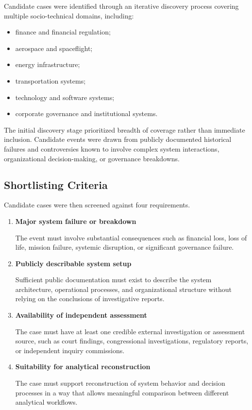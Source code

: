 Candidate cases were identified through an iterative discovery process
covering multiple socio-technical domains, including:

\begin{itemize}

\item finance and financial regulation;

\item aerospace and spaceflight;

\item energy infrastructure;

\item transportation systems;

\item technology and software systems;

\item corporate governance and institutional systems.

\end{itemize}

The initial discovery stage prioritized breadth of coverage rather than
immediate inclusion. Candidate events were drawn from publicly documented
historical failures and controversies known to involve complex system
interactions, organizational decision-making, or governance breakdowns.

\subsection{Shortlisting Criteria}

Candidate cases were then screened against four requirements.

\begin{enumerate}

\item \textbf{Major system failure or breakdown}

The event must involve substantial consequences such as financial loss,
loss of life, mission failure, systemic disruption, or significant
governance failure.

\item \textbf{Publicly describable system setup}

Sufficient public documentation must exist to describe the system
architecture, operational processes, and organizational structure without
relying on the conclusions of investigative reports.

\item \textbf{Availability of independent assessment}

The case must have at least one credible external investigation or
assessment source, such as court findings, congressional investigations,
regulatory reports, or independent inquiry commissions.

\item \textbf{Suitability for analytical reconstruction}

The case must support reconstruction of system behavior and decision
processes in a way that allows meaningful comparison between different
analytical workflows.

\end{enumerate}

